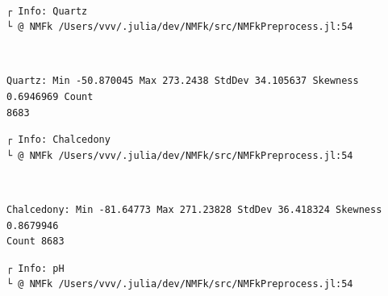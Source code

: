 \documentclass[11pt]{article}
\begin{document}
    \begin{center}
    \end{center}
    { \hspace*{\fill} \\}
    
    \begin{Verbatim}[commandchars=\\\{\}]

    \end{Verbatim}

    \begin{Verbatim}[commandchars=\\\{\}]
┌ Info: Quartz
└ @ NMFk /Users/vvv/.julia/dev/NMFk/src/NMFkPreprocess.jl:54
    \end{Verbatim}

    \begin{center}
    \end{center}
    { \hspace*{\fill} \\}
    
    \begin{Verbatim}[commandchars=\\\{\}]
Quartz: Min -50.870045 Max 273.2438 StdDev 34.105637 Skewness 0.6946969 Count
8683
    \end{Verbatim}

    \begin{Verbatim}[commandchars=\\\{\}]
┌ Info: Chalcedony
└ @ NMFk /Users/vvv/.julia/dev/NMFk/src/NMFkPreprocess.jl:54
    \end{Verbatim}

    \begin{center}
    \end{center}
    { \hspace*{\fill} \\}
    
    \begin{Verbatim}[commandchars=\\\{\}]
Chalcedony: Min -81.64773 Max 271.23828 StdDev 36.418324 Skewness 0.8679946
Count 8683
    \end{Verbatim}

    \begin{Verbatim}[commandchars=\\\{\}]
┌ Info: pH
└ @ NMFk /Users/vvv/.julia/dev/NMFk/src/NMFkPreprocess.jl:54
    \end{Verbatim}
\end{document}
